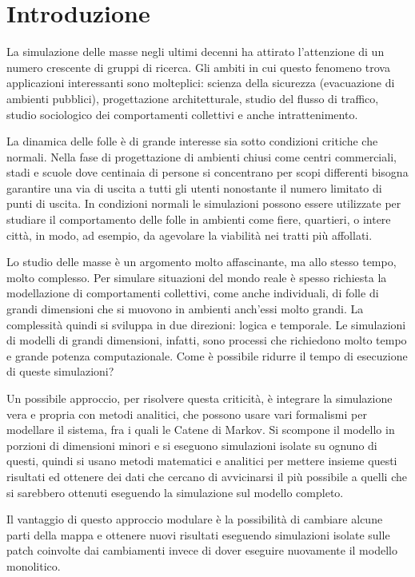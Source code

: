 \chapter{Introduzione}

La simulazione delle masse negli ultimi decenni ha attirato l'attenzione di un numero crescente di gruppi di ricerca. Gli ambiti in cui questo fenomeno trova applicazioni interessanti sono molteplici: scienza della sicurezza (evacuazione di ambienti pubblici), progettazione architetturale, studio del flusso di traffico, studio sociologico dei comportamenti collettivi e anche intrattenimento.

La dinamica delle folle è di grande interesse sia sotto condizioni critiche che normali. Nella fase di progettazione di ambienti chiusi come centri commerciali, stadi e scuole dove centinaia di persone si concentrano per scopi differenti bisogna garantire una via di uscita a tutti gli utenti nonostante il numero limitato di punti di uscita. In condizioni normali le simulazioni possono essere utilizzate per studiare il comportamento delle folle in ambienti come fiere, quartieri, o intere città, in modo, ad esempio, da agevolare la viabilità nei tratti più affollati.

Lo studio delle masse è un argomento molto affascinante, ma allo stesso tempo, molto complesso. Per simulare situazioni del mondo reale è spesso richiesta la modellazione di comportamenti collettivi, come anche individuali, di folle di grandi dimensioni che si muovono in ambienti anch'essi molto grandi. La complessità quindi si sviluppa in due direzioni: logica e temporale. Le simulazioni di modelli di grandi dimensioni, infatti, sono processi che richiedono molto tempo e grande potenza computazionale. Come è possibile ridurre il tempo di esecuzione di queste simulazioni? 

Un possibile approccio, per risolvere questa criticità, è integrare la simulazione vera e propria con metodi analitici, che possono usare vari formalismi per modellare il sistema, fra i quali le Catene di Markov. Si scompone il modello in porzioni di dimensioni minori e si eseguono simulazioni isolate su ognuno di questi, quindi si usano metodi matematici e analitici per mettere insieme questi risultati ed ottenere dei dati che cercano di avvicinarsi il più possibile a quelli che si sarebbero ottenuti eseguendo la simulazione sul modello completo.

Il vantaggio di questo approccio modulare è la possibilità di cambiare alcune parti della mappa e ottenere nuovi risultati eseguendo simulazioni isolate sulle patch coinvolte dai cambiamenti invece di dover eseguire nuovamente il modello monolitico.

